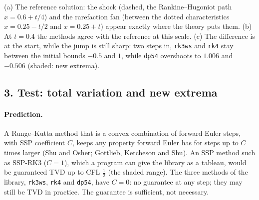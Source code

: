 \documentclass[11pt,a4paper]{article}
\begin{document}
\begin{center}
\end{center}
(a) The reference solution: the shock (dashed, the Rankine--Hugoniot path
$x = 0.6 + t/4$) and the rarefaction fan (between the dotted characteristics
$x = 0.25 - t/2$ and $x = 0.25 + t$) appear exactly where the theory puts
them. (b) At $t = 0.4$ the methods agree with the reference at this scale.
(c) The difference is at the start, while the jump is still sharp: two steps
in, \texttt{rk3ws} and \texttt{rk4} stay between the initial bounds $-0.5$ and
$1$, while \texttt{dp54} overshoots to $1.006$ and $-0.506$ (shaded: new
extrema).

\newpage
\subsection*{3. Test: total variation and new extrema}

\paragraph{Prediction.} A Runge--Kutta method that is a convex combination of
forward Euler steps, with SSP coefficient $C$, keeps any property forward
Euler has for steps up to $C$ times larger (Shu and Osher; Gottlieb, Ketcheson
and Shu). An SSP method such as SSP-RK3 ($C = 1$), which a program can give
the library as a tableau, would be guaranteed TVD up to CFL $\tfrac12$ (the
shaded range). The three methods of the library, \texttt{rk3ws}, \texttt{rk4}
and \texttt{dp54}, have $C = 0$: no guarantee at any step; they may still be
TVD in practice. The guarantee is sufficient, not necessary.
\end{document}
